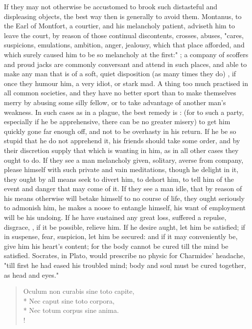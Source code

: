 {If they may not otherwise be accustomed to brook such distasteful and displeasing objects, the best way then is generally to avoid them. Montanus,  to the Earl of Montfort, a courtier, and his melancholy patient, adviseth him to leave the court, by reason of those continual discontents, crosses, abuses, "cares, suspicions, emulations, ambition, anger, jealousy, which that place afforded, and which surely caused him to be so melancholy at the first:" ; a company of scoffers and proud jacks are commonly conversant and attend in such places, and able to make any man that is of a soft, quiet disposition (as many times they do) , if once they humour him, a very idiot, or stark mad. A thing too much practised in all common societies, and they have no better sport than to make themselves merry by abusing some silly fellow, or to take advantage of another man's weakness. In such cases as in a plague, the best remedy is : (for to such a party, especially if he be apprehensive, there can be no greater misery) to get him quickly gone far enough off, and not to be overhasty in his return. If he be so stupid that he do not apprehend it, his friends should take some order, and by their discretion supply that which is wanting in him, as in all other cases they ought to do. If they see a man melancholy given, solitary, averse from company, please himself with such private and vain meditations, though he delight in it, they ought by all means seek to divert him, to dehort him, to tell him of the event and danger that may come of it. If they see a man idle, that by reason of his means otherwise will betake himself to no course of life, they ought seriously to admonish him, he makes a noose to entangle himself, his want of employment will be his undoing. If he have sustained any great loss, suffered a repulse, disgrace, \etc{}, if it be possible, relieve him. If he desire aught, let him be satisfied; if in suspense, fear, suspicion, let him be secured: and if it may conveniently be, give him his heart's content; for the body cannot be cured till the mind be satisfied. Socrates, in Plato, would prescribe no physic for Charmides' headache, "till first he had eased his troubled mind; body and soul must be cured together, as head and eyes."

\begin{latin}
\begin{verse}%
Oculum non curabis sine toto capite,\\*
Nec caput sine toto corpora,\\*
Nec totum corpus sine anima.\\!
\end{verse}%
\end{latin}

}
